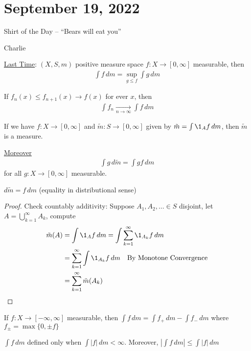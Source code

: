\section{September 19, 2022}

\epigraph{Shirt of the Day -- ``Bears will eat you''}{Charlie}

\noindent\underline{Last Time}:
$(X, S, m)$ positive measure space $f : X \to [0,\infty]$ measurable, then
\begin{align*}
	\int f \, dm = \sup_{g \leq f} \int g \, dm
\end{align*}


\begin{theorem}
	If $f_n(x) \leq f_{n+1}(x) \to f(x)$ for ever $x$, then
	\begin{align*}
		\int f_n \xrightarrow[n \to \infty]{} \int f \, dm
	\end{align*}
\end{theorem}

\begin{corollary}
	If we have $f: X \to [0,\infty]$ and $\tilde{m} : S \to [0,\infty]$ given by $\tilde{m} = \int \1_A f \, dm$, then $\tilde{m}$ is a measure.

	\underline{Moreover}
	\begin{align*}
		\int g \, d\tilde{m} = \int g f \, dm
	\end{align*} for all $g :X \to [0,\infty]$ measurable.

\end{corollary}

\begin{notation}
	$d \tilde{m} = f \, dm$ (equality in distributional sense)
\end{notation}

\begin{proof}
	Check countably additivity:
	Suppose $A_1, A_2, \ldots \in S$ disjoint, let  $A = \bigcup_{k=1}^{\infty} A_k$, compute
	\begin{align*}
		\tilde{m}(A) &= \int \1_{A} f \, dm
					 = \int \sum_{k=1}^{\infty} \1_{A_k} f \, dm \\
					 &= \sum_{k=1}^{\infty} \int \1_{A_k} f \, dm \quad \text{By Monotone Convergence} \\
					 &=  \sum_{k=1}^{\infty} \tilde{m}( A_k )
	\end{align*}
\end{proof}

\begin{definition}
	If $f: X \to [ - \infty, \infty]$ measurable, then  $\int f \, dm = \int f_{+} \, dm - \int f_{-} \, dm$ where
	$f_{\pm} = \max\{0, \pm f\}$
\begin{remark}
	$\int f \, dm$ defined only when $\int |f| \, dm < \infty$. Moreover,  $|\int f \, dm | \leq \int |f| \, dm$
\end{remark}
\end{definition}

